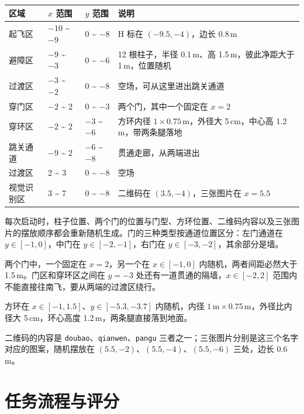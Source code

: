 \documentclass[11pt]{ctexart}
\begin{document}
\begin{center}
\begin{tabular}{@{}llll@{}}
\toprule
区域 & $x$ 范围 & $y$ 范围 & 说明 \\
\midrule
起飞区 & $-10$ \textasciitilde{} $-9$ & 0 \textasciitilde{} $-8$ & H 标在 $(-9.5,-4)$，边长 0.8\,m \\
避障区 & $-9$ \textasciitilde{} $-3$ & 0 \textasciitilde{} $-6$ & 12 根柱子，半径 0.1\,m、高 1.5\,m，彼此净距大于 1\,m，位置随机 \\
过渡区 & $-3$ \textasciitilde{} $-2$ & 0 \textasciitilde{} $-8$ & 空场，可从这里进出跳关通道 \\
穿门区 & $-2$ \textasciitilde{} 2 & 0 \textasciitilde{} $-3$ & 两个门，其中一个固定在 $x=2$ \\
穿环区 & $-2$ \textasciitilde{} 2 & $-3$ \textasciitilde{} $-6$ & 方环内径 $1\times0.75$\,m，外径大 5\,cm，中心高 1.2\,m，带两条腿落地 \\
跳关通道 & $-9$ \textasciitilde{} 2 & $-6$ \textasciitilde{} $-8$ & 贯通走廊，从两端进出 \\
过渡区 & 2 \textasciitilde{} 3 & 0 \textasciitilde{} $-8$ & 空场 \\
视觉识别区 & 3 \textasciitilde{} 7 & 0 \textasciitilde{} $-8$ & 二维码在 $(3.5,-4)$，三张图片在 $x=5.5$ \\
\bottomrule
\end{tabular}
\end{center}

每次启动时，柱子位置、两个门的位置与门型、方环位置、二维码内容以及三张图片的摆放顺序都会重新随机生成。门的三种类型按通道位置区分：左门通道在 $y\in[-1,0]$，中门在 $y\in[-2,-1]$，右门在 $y\in[-3,-2]$，其余部分是墙。

两个门中，一个固定在 $x=2$，另一个在 $x\in[-1,0]$ 内随机，两者间距必然大于 1.5\,m。门区和穿环区之间在 $y=-3$ 处还有一道贯通的隔墙，$x\in[-2,2]$ 范围内不能直接往南飞，要从两端的过渡区绕行。

方环在 $x\in[-1,1.5]$、$y\in[-5.3,-3.7]$ 内随机，内径 $1\,\mathrm{m}\times0.75\,\mathrm{m}$，外径比内径大 5\,cm，环心高度 1.2\,m，两条腿直接落到地面。

二维码的内容是 \texttt{doubao}、\texttt{qianwen}、\texttt{pangu} 三者之一；三张图片分别是这三个名字对应的图案，随机摆放在 $(5.5,-2)$、$(5.5,-4)$、$(5.5,-6)$ 三处，边长 0.6\,m。

\section{任务流程与评分}
\end{document}
